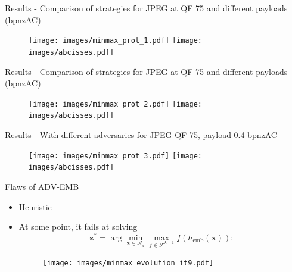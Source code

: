 \documentclass[10pt]{beamer}
\newcommand{\femb}{h_{\mathrm{emb}}}
\newcommand{\fset}{\mathcal{F}}
\begin{document}
\begin{frame}{Results - Comparison of strategies for JPEG at QF 75 and different payloads (bpnzAC)}
    \begin{figure}
        \texttt{[image: images/minmax\_prot\_1.pdf]}
        \texttt{[image: images/abcisses.pdf]}
    \end{figure}
\end{frame}

\begin{frame}{Results - Comparison of strategies for JPEG at QF 75 and different payloads (bpnzAC)}
    \begin{figure}
        \texttt{[image: images/minmax\_prot\_2.pdf]}
        \texttt{[image: images/abcisses.pdf]}
    \end{figure}
\end{frame}

\begin{frame}{Results - With different adversaries for JPEG QF 75, payload 0.4 bpnzAC}
    \begin{figure}
        \texttt{[image: images/minmax\_prot\_3.pdf]}
        \texttt{[image: images/abcisses.pdf]}
    \end{figure}
\end{frame}


\begin{frame}{Flaws of ADV-EMB}
    

\begin{itemize}
        \item Heuristic
        \pause
        \item At some point, it fails at solving
        \begin{equation*}
            \mathbf{z}^\ast = \arg \min_{\mathbf{z} \in \mathcal{A}_a} \max_{f \in \fset^{k-1}} f(\femb(\mathbf{x}));
        \end{equation*} 
        
        \begin{figure}
        \texttt{[image: images/minmax\_evolution\_it9.pdf]}
    \end{figure}
          
    \end{itemize}
\end{frame}
\end{document}
